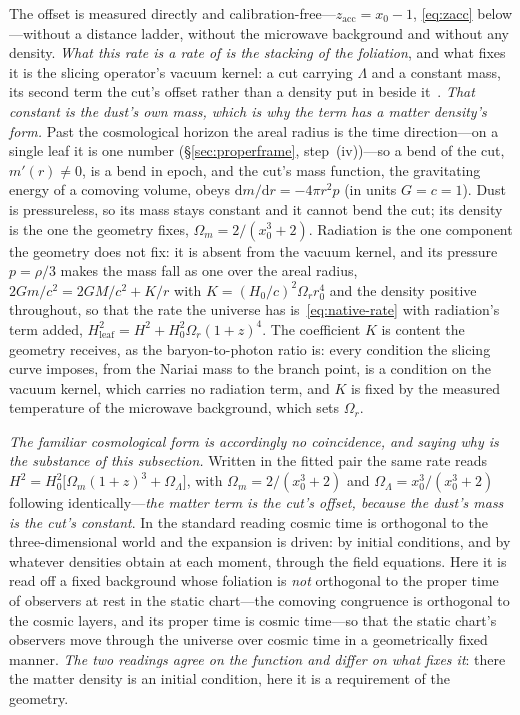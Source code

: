 \documentclass[11pt,a4paper]{article}
\theoremstyle{plain}
\theoremstyle{definition}
\theoremstyle{remark}
\newcommand{\dd}{\mathrm{d}}   %
\begin{document}
The offset is measured directly and calibration-free---$z_{\mathrm{acc}}=x_{0}-1$, \eqref{eq:zacc} below---without a distance ladder, without the microwave background and without any density. \emph{What this rate is a rate of is the stacking of the foliation}, and what fixes it is the slicing operator's vacuum kernel: a cut carrying $\Lambda$ and a constant mass, its second term the cut's offset rather than a density put in beside it~\cite{JanzenOperator,JanzenCRframework}. \emph{That constant is the dust's own mass, which is why the term has a matter density's form.} Past the cosmological horizon the areal radius is the time direction---on a single leaf it is one number (\S\ref{sec:properframe}, step~(iv))---so a bend of the cut, $m'(r)\neq0$, is a bend in epoch, and the cut's mass function, the gravitating energy of a comoving volume, obeys $\dd m/\dd r=-4\pi r^{2}p$ (in units $G=c=1$). Dust is pressureless, so its mass stays constant and it cannot bend the cut; its density is the one the geometry fixes, $\Omega_m=2/(x_{0}^{3}+2)$. Radiation is the one component the geometry does not fix: it is absent from the vacuum kernel, and its pressure $p=\rho/3$ makes the mass fall as one over the areal radius, $2Gm/c^{2}=2GM/c^{2}+K/r$ with $K=(H_0/c)^{2}\Omega_r r_0^{4}$ and the density positive throughout, so that the rate the universe has is~\eqref{eq:native-rate} with radiation's term added, $H_{\mathrm{leaf}}^{2}=H^{2}+H_0^{2}\Omega_r(1+z)^{4}$. The coefficient $K$ is content the geometry receives, as the baryon-to-photon ratio is: every condition the slicing curve imposes, from the Nariai mass to the branch point, is a condition on the vacuum kernel, which carries no radiation term, and $K$ is fixed by the measured temperature of the microwave background, which sets $\Omega_r$.

\emph{The familiar cosmological form is accordingly no coincidence, and saying why is the substance of this subsection.} Written in the fitted pair the same rate reads $H^{2}=H_{0}^{2}\bigl[\Omega_m(1+z)^{3}+\Omega_\Lambda\bigr]$, with $\Omega_m=2/(x_{0}^{3}+2)$ and $\Omega_\Lambda=x_{0}^{3}/(x_{0}^{3}+2)$ following identically---\emph{the matter term is the cut's offset, because the dust's mass is the cut's constant}. In the standard reading cosmic time is orthogonal to the three-dimensional world and the expansion is driven: by initial conditions, and by whatever densities obtain at each moment, through the field equations. Here it is read off a fixed background whose foliation is \emph{not} orthogonal to the proper time of observers at rest in the static chart---the comoving congruence is orthogonal to the cosmic layers, and its proper time is cosmic time---so that the static chart's observers move through the universe over cosmic time in a geometrically fixed manner. \emph{The two readings agree on the function and differ on what fixes it}: there the matter density is an initial condition, here it is a requirement of the geometry.
\end{document}
